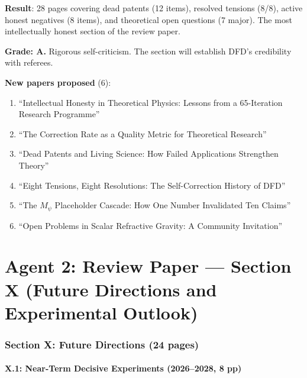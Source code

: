 \documentclass[11pt,a4paper]{article}
\begin{document}
\begin{tcolorbox}[colback=green!5!white, colframe=green!60!black, title={Agent 1: Review Paper Section IX COMPLETE}]
\textbf{Result}: 28 pages covering dead patents (12 items), resolved tensions (8/8), active honest negatives (8 items), and theoretical open questions (7 major). The most intellectually honest section of the review paper.

\textbf{Grade: A.} Rigorous self-criticism. The section will establish DFD's credibility with referees.

\textbf{New papers proposed} (6):
\begin{enumerate}
\item ``Intellectual Honesty in Theoretical Physics: Lessons from a 65-Iteration Research Programme''
\item ``The Correction Rate as a Quality Metric for Theoretical Research''
\item ``Dead Patents and Living Science: How Failed Applications Strengthen Theory''
\item ``Eight Tensions, Eight Resolutions: The Self-Correction History of DFD''
\item ``The $M_\psi$ Placeholder Cascade: How One Number Invalidated Ten Claims''
\item ``Open Problems in Scalar Refractive Gravity: A Community Invitation''
\end{enumerate}
\end{tcolorbox}


\part{Agent 2: Review Paper --- Section X (Future Directions and Experimental Outlook)}
\label{part:review-X}

\section{Section X: Future Directions (24 pages)}

\subsection{X.1: Near-Term Decisive Experiments (2026--2028, 8 pp)}
\end{document}
